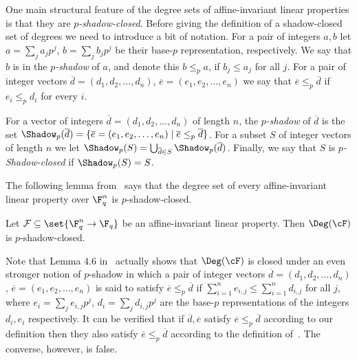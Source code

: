 One main structural feature of the degree sets of affine-invariant linear properties is that
they are \emph{$p$-shadow-closed}. Before giving the definition of a shadow-closed set of degrees we need to introduce a bit of notation.
For a pair of integers $a,b$ let
$a= \sum_j a_j p^j$, $b= \sum_j b_jp^j$ be their base-$p$ representation, respectively. We say that $b$ is in the \emph{$p$-shadow} of $a$, and denote this $b \leq_p a$, if $b_j \leq a_j$ for all $j$.
For a pair of integer vectors $ \overline d=(d_1,d_2,\ldots,d_n)$, $\overline e=(e_1,e_2,\ldots,e_n)$ we say that
$\overline e \leq_p  \overline d$ if
$e_i \leq_p d_i$ for every $i$.

\begin{definition}\label{defn:shadow-closed}
For a vector of integers $\overline d=(d_1,d_2,\ldots,d_n)$ of length $n$, the \emph{$p$-shadow} of $\overline d$ is the set
$\Shadow_p(\overline d) = \{\overline e=(e_1,e_2,\ldots,e_n) \mid \overline e \leq_p \overline d\}$.
For a subset $S$ of integer vectors  of length $n$ we let
$\Shadow_p(S) = \bigcup_{\overline d \in S} \Shadow_p(\overline d)$.
Finally, we say that $S$ is \emph{$p$-Shadow-closed} if $\Shadow_p(S) = S$.
\end{definition}

The following lemma from~\cite{KS08-ECCC} says that the degree set of every affine-invariant linear property over $\F_q^n$ is $p$-shadow-closed.

\begin{lemma}\label{lem:monomial-spread}
%
Let $\mathcal{F} \subseteq \set{\F_{q}^n \to \F_q}$ be an affine-invariant linear property. Then $\Deg(\cF)$ is $p$-shadow-closed.
\end{lemma}

\begin{remark}
Note that Lemma 4.6 in~\cite{KS08-ECCC} actually shows that $\Deg(\cF)$ is closed under an even stronger notion of $p$-shadow in which a pair of integer vectors $ \overline d=(d_1,d_2,\ldots,d_n)$, $\overline e=(e_1,e_2,\ldots,e_n)$ is said to satisfy
$\overline e \leq_p  \overline d$ if $\sum_{i=1}^n e_{i,j} \leq \sum_{i=1}^n d_{i,j}$ for all $j$, where $e_i = \sum_{j} e_{i,j} p^j$,  $d_i = \sum_{j} d_{i,j} p^j$ are the base-$p$ representations
of the integers $d_i, e_i$ respectively. It can be verified that if $\overline d, \overline e$ satisfy $\overline e \leq_p \overline d$ according to our definition then they also satisfy  $\overline e \leq_p \overline d$   according to the definition of~\cite{KS08-ECCC}. The converse, however, is false.
\end{remark}

